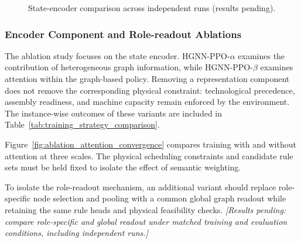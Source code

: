\begin{figure}[t]
\centering
{}
\caption{State-encoder comparison across independent runs (results pending).}
\label{fig:encoder_pending}
\end{figure}

\subsubsection{Encoder Component and Role-readout Ablations}
The ablation study focuses on the state encoder. HGNN-PPO-$\alpha$ examines the contribution of heterogeneous graph information,
while HGNN-PPO-$\beta$ examines attention within the graph-based policy. Removing a representation
component does not remove the corresponding physical constraint: technological precedence,
assembly readiness, and machine capacity remain enforced by the environment. The instance-wise outcomes
of these variants are included in Table~\ref{tab:training_strategy_comparison}.


Figure~\ref{fig:ablation_attention_convergence} compares training with and without attention at three scales.
The physical scheduling constraints and candidate rule sets must be held fixed to isolate the effect of semantic weighting.

To isolate the role-readout mechanism, an additional variant should replace role-specific node selection
and pooling with a common global graph readout while retaining the same rule heads and physical feasibility checks.
\textit{[Results pending: compare role-specific and global readout under matched training and evaluation conditions,
including independent runs.]}

